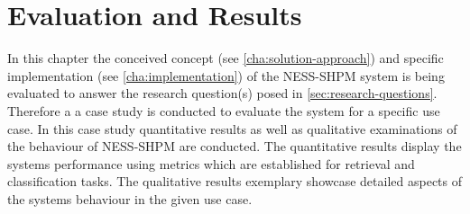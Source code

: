 \documentclass[11pt]{scrreprt}
\begin{document}
%
%




\chapter{Evaluation and Results}
In this chapter the conceived concept (see \cref{cha:solution-approach}) and specific implementation (see \cref{cha:implementation}) of the NESS-SHPM system is being evaluated to answer the research question(s) posed in \cref{sec:research-questions}. Therefore a a case study is conducted to evaluate the system for a specific use case. In this case study quantitative results as well as qualitative examinations of the behaviour of NESS-SHPM are conducted. The quantitative results display the systems performance using metrics which are established for retrieval and classification tasks. The qualitative results exemplary showcase detailed aspects of the systems behaviour in the given use case.
\end{document}
